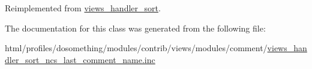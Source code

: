 Reimplemented from \hyperlink{classviews__handler__sort_a94fa33c5d037e41a927583fce2df3d18}{views\_\-handler\_\-sort}.

The documentation for this class was generated from the following file:\begin{DoxyCompactItemize}
\item 
html/profiles/dosomething/modules/contrib/views/modules/comment/\hyperlink{views__handler__sort__ncs__last__comment__name_8inc}{views\_\-handler\_\-sort\_\-ncs\_\-last\_\-comment\_\-name.inc}\end{DoxyCompactItemize}
